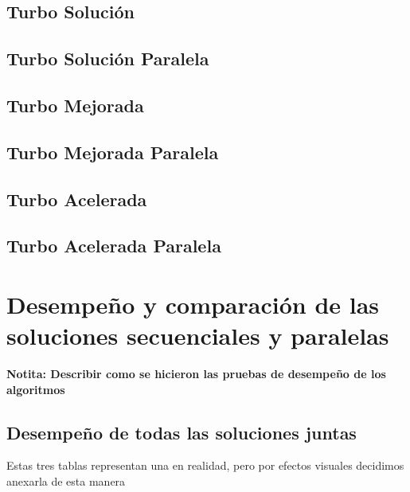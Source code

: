 \documentclass[conference]{IEEEtran}
\begin{document}
\subsection{\textbf{Turbo Solución}}

\subsection{\textbf{Turbo Solución Paralela}}

\subsection{\textbf{Turbo Mejorada}}

\subsection{\textbf{Turbo Mejorada Paralela}}

\subsection{\textbf{Turbo Acelerada}}

\subsection{\textbf{Turbo Acelerada Paralela}}



\section{\textbf{Desempeño  y comparación de las soluciones secuenciales y paralelas} }

\textbf{Notita: Describir como se hicieron las pruebas de desempeño de los algoritmos}


\subsection{\textbf{Desempeño de todas las soluciones juntas}}

Estas tres tablas representan una en realidad, pero por efectos visuales decidimos anexarla de esta manera
\end{document}
